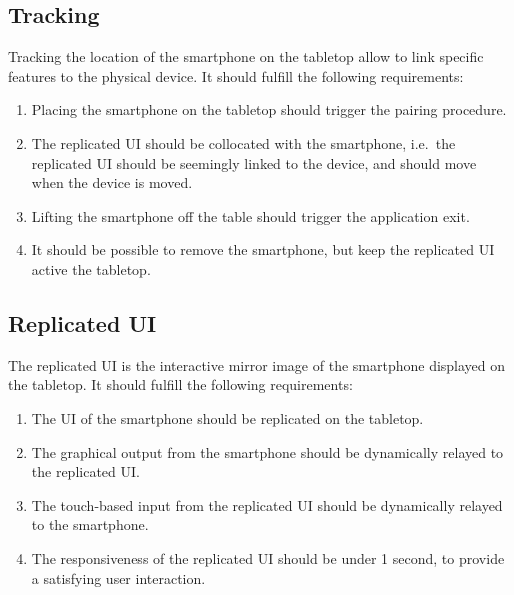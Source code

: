 \subsection{Tracking}

Tracking the location of the smartphone on the tabletop allow to link specific features to the physical device.
It should fulfill the following requirements:

\label{RB}
\begin{enumerate}[{RB}-1]
\item Placing the smartphone on the tabletop should trigger the pairing procedure.
\item The replicated UI should be collocated with the smartphone, i.e.\ the replicated UI should be seemingly linked to the device, and should move when the device is moved.
\item Lifting the smartphone off the table should trigger the application exit.
\item It should be possible to remove the smartphone, but keep the replicated UI active the tabletop.
\end{enumerate}


\subsection{Replicated UI}

The replicated UI is the interactive mirror image of the smartphone displayed on the tabletop.
It should fulfill the following requirements:

\label{RC}
\begin{enumerate}[{RC}-1]
\item The UI of the smartphone should be replicated on the tabletop.
\item The graphical output from the smartphone should be dynamically relayed to the replicated UI.
\item The touch-based input from the replicated UI should be dynamically relayed to the smartphone.
\item The responsiveness of the replicated UI should be under 1 second, to provide a satisfying user interaction.
\end{enumerate}


